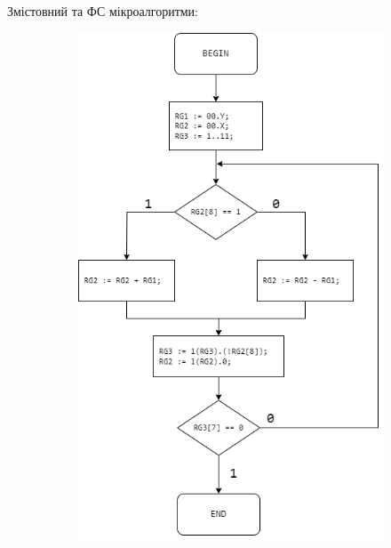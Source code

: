 \documentclass[12pt,a4paper]{article}
\begin{document}
    \newpage

    Змістовний та ФС мікроалгоритми:

    \begin{figure}[h!]
        \centering
        
        \begin{subfigure}[t]{0.5\textwidth}
            \centering
            \includegraphics[width=\linewidth]{structure_div_alg.png}
        \end{subfigure}
        \hfill
        \begin{subfigure}[t]{0.45\textwidth}
            \centering

\end{subfigure}
\end{figure}
\end{document}
